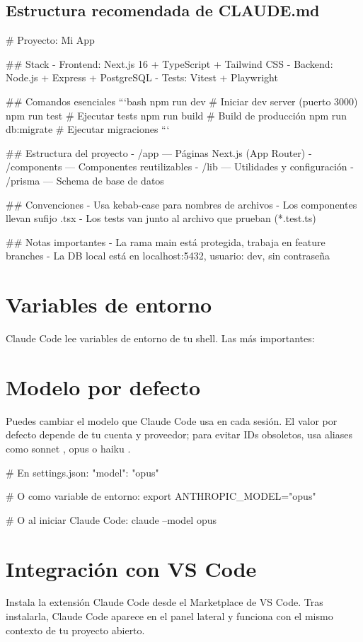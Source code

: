 \documentclass[11pt,a4paper]{book}
\begin{document}
\subsection{Estructura recomendada de CLAUDE.md}
\begin{codebox}
# Proyecto: Mi App

## Stack
- Frontend: Next.js 16 + TypeScript + Tailwind CSS
- Backend: Node.js + Express + PostgreSQL
- Tests: Vitest + Playwright

## Comandos esenciales
```bash
npm run dev          # Iniciar dev server (puerto 3000)
npm run test         # Ejecutar tests
npm run build        # Build de producción
npm run db:migrate   # Ejecutar migraciones
```

## Estructura del proyecto
- /app — Páginas Next.js (App Router)
- /components — Componentes reutilizables
- /lib — Utilidades y configuración
- /prisma — Schema de base de datos

## Convenciones
- Usa kebab-case para nombres de archivos
- Los componentes llevan sufijo .tsx
- Los tests van junto al archivo que prueban (*.test.ts)

## Notas importantes
- La rama main está protegida, trabaja en feature branches
- La DB local está en localhost:5432, usuario: dev, sin contraseña
\end{codebox}
\section{Variables de entorno}
Claude Code lee variables de entorno de tu shell. Las más importantes:

\section{Modelo por defecto}
Puedes cambiar el modelo que Claude Code usa en cada sesión. El valor por defecto depende de tu cuenta y proveedor; para evitar IDs obsoletos, usa aliases como sonnet , opus o haiku .

\begin{codebox}
# En settings.json:
{ "model": "opus" }

# O como variable de entorno:
export ANTHROPIC_MODEL="opus"

# O al iniciar Claude Code:
claude --model opus
\end{codebox}
\section{Integración con VS Code}
Instala la extensión Claude Code desde el Marketplace de VS Code. Tras instalarla, Claude Code aparece en el panel lateral y funciona con el mismo contexto de tu proyecto abierto.
\end{document}
